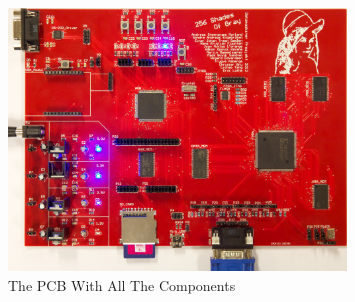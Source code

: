 \begin{figure}[h]
  \centering
  \includegraphics[width=0.8\textwidth]{fig/pcb/pcbwithcomp}
  \caption{The PCB With All The Components}
  \label{fig:pcb}
\end{figure}